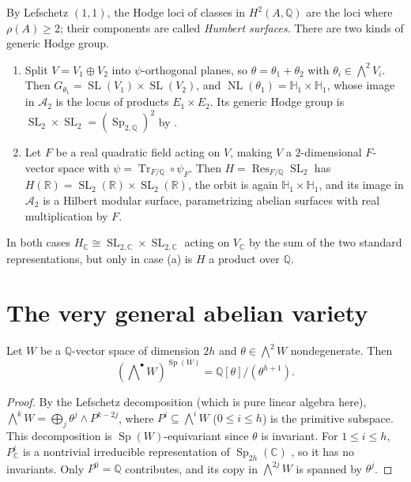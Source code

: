 \documentclass[12pt]{amsart}
\newcommand{\R}{\mathbb{R}}
\newcommand{\Q}{\mathbb{Q}}
\newcommand{\C}{\mathbb{C}}
\DeclareMathOperator{\SL}{SL}
\DeclareMathOperator{\Sp}{Sp}
\DeclareMathOperator{\NL}{NL}
\DeclareMathOperator{\Res}{Res}
\DeclareMathOperator{\Tr}{Tr}
\newcommand{\cA}{\mathcal{A}}
\newcommand{\HH}{\mathbb{H}}
\let\oldbigwedge\bigwedge
\renewcommand{\bigwedge}{\mathop{\textstyle\oldbigwedge}\nolimits}
\theoremstyle{definition}
\theoremstyle{remark}
\numberwithin{equation}{section}
\begin{document}
\begin{example}[$\cA_2$]\label{ex:A2}
    By Lefschetz $(1,1)$, the Hodge loci of classes in $H^2(A, \Q)$ are the
    loci where $\rho(A) \geq 2$; their components are called \emph{Humbert
    surfaces}. There are two kinds of generic Hodge group.
    \begin{enumerate}[label=(\alph*)]
        \item Split $V = V_1 \oplus V_2$ into $\psi$-orthogonal planes, so
        $\theta = \theta_1 + \theta_2$ with $\theta_i \in \bigwedge^2 V_i$. Then
        $G_{\theta_1} = \SL(V_1) \times \SL(V_2)$, and
        $\NL(\theta_1) = \HH_1 \times \HH_1$, whose image in $\cA_2$
        is the locus of products $E_1 \times E_2$. Its generic Hodge group is
        $\SL_2 \times \SL_2 = (\Sp_{2,\Q})^2$ by
        .
        \item Let $F$ be a real quadratic field acting on $V$, making $V$ a
        $2$-dimensional $F$-vector space with $\psi = \Tr_{F/\Q} \circ \psi_F$.
        Then $H = \Res_{F/\Q} \SL_2$ has $H(\R) = \SL_2(\R) \times \SL_2(\R)$,
        the orbit is again $\HH_1 \times \HH_1$, and its image in $\cA_2$ is a
        Hilbert modular surface, parametrizing abelian surfaces with real
        multiplication by $F$.
    \end{enumerate}
    In both cases $H_\C \cong \SL_{2,\C} \times \SL_{2,\C}$ acting on $V_\C$ by
    the sum of the two standard representations, but only in case (a) is $H$ a
    product over $\Q$.
\end{example}

\section{The very general abelian variety}

\begin{lemma}\label{lem:sp-invariants}
    Let $W$ be a $\Q$-vector space of dimension $2h$ and
    $\theta \in \bigwedge^2 W$ nondegenerate. Then
    \begin{equation*}
        (\bigwedge^\bullet W)^{\Sp(W)} = \Q[\theta]/(\theta^{h+1}).
    \end{equation*}
\end{lemma}
\begin{proof}
    By the Lefschetz decomposition (which is pure linear algebra here),
    $\bigwedge^k W = \bigoplus_j \theta^j \wedge P^{k-2j}$, where
    $P^i \subseteq \bigwedge^i W$ ($0 \leq i \leq h$) is the primitive subspace.
    This decomposition is $\Sp(W)$-equivariant since $\theta$ is invariant. For
    $1 \leq i \leq h$, $P^i_\C$ is a nontrivial irreducible representation of
    $\Sp_{2h}(\C)$ \cite[Theorem 17.5]{FH91}, so it has no invariants. Only
    $P^0 = \Q$ contributes, and its copy in $\bigwedge^{2j} W$ is spanned by
    $\theta^j$.
\end{proof}
\end{document}
